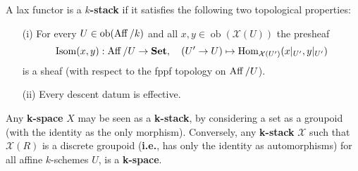 \documentclass[12pt]{article}
\begin{document}
\begin{definition}
    A lax functor is a \textbf{$k$-stack} if it satisfies the following two topological properties:

    \begin{enumerate}
        \item[(i)] For every $U \in \operatorname{ob}(\operatorname{Aff}/k)$ and all $x, y \in \operatorname{ob}(\mathcal{X}(U))$ the presheaf
              \[
                  \operatorname{Isom}(x,y) : \operatorname{Aff}/U \to \mathbf{Set}, \quad (U' \to U) \mapsto \operatorname{Hom}_{\mathcal{X}(U')}(x|_{U'}, y|_{U'})
              \]
              is a sheaf (with respect to the fppf topology on $\operatorname{Aff}/U$).
        \item[(ii)] Every descent datum is effective.
    \end{enumerate}
\end{definition}

\begin{remark}
    Any \textbf{k-space} $X$ may be seen as a \textbf{k-stack}, by considering a set as a groupoid (with the identity as the only morphism).
    Conversely, any \textbf{k-stack} $\mathcal{X}$ such that $\mathcal{X}(R)$ is a discrete groupoid (\textbf{i.e.}, has only the identity as automorphisms)
    for all affine $k$-schemes $U$, is a \textbf{k-space}.
\end{remark}
\end{document}
